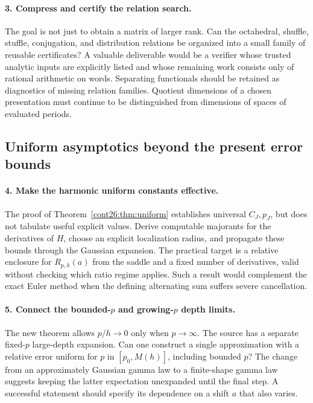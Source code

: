 \paragraph{3. Compress and certify the relation search.}
The goal is not just to obtain a matrix of larger rank. Can the
octahedral, shuffle, stuffle, conjugation, and distribution relations
be organized into a small family of reusable certificates?
A valuable deliverable would be a verifier whose trusted analytic
inputs are explicitly listed and whose remaining work consists only
of rational arithmetic on words. Separating functionals should be
retained as diagnostics of missing relation families. Quotient
dimensions of a chosen presentation must continue to be
distinguished from dimensions of spaces of evaluated periods.

\subsection{Uniform asymptotics beyond the present error bounds}

\paragraph{4. Make the harmonic uniform constants effective.}
The proof of Theorem~\ref{cont26:thm:uniform} establishes universal
$C_J,p_J$, but does not tabulate useful explicit values. Derive
computable majorants for the derivatives of $H$, choose an explicit
localization radius, and propagate these bounds through the
Gaussian expansion. The practical target is a relative enclosure
for $R_{p,h}(a)$ from the saddle and a fixed number of derivatives,
valid without checking which ratio regime applies. Such a result
would complement the exact Euler method when the defining
alternating sum suffers severe cancellation.

\paragraph{5. Connect the bounded-$p$ and growing-$p$ depth limits.}
The new theorem allows $p/h\to0$ only when $p\to\infty$.
The source has a separate fixed-$p$ large-depth expansion.
Can one construct a single approximation with a relative error
uniform for $p$ in $[p_0,M(h)]$, including bounded $p$?
The change from an approximately Gaussian gamma law to a
finite-shape gamma law suggests keeping the latter expectation
unexpanded until the final step. A successful statement should
specify its dependence on a shift $a$ that also varies.

